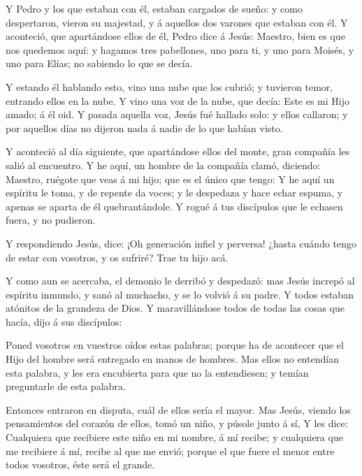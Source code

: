 Y Pedro y los que estaban con él, estaban cargados de
sueño: y como despertaron, vieron su majestad, y á aquellos dos varones
que estaban con él.  Y aconteció, que apartándose ellos de
él, Pedro dice á Jesús: Maestro, bien es que nos quedemos aquí: y
hagamos tres pabellones, uno para ti, y uno para Moisés, y uno para
Elías; no sabiendo lo que se decía.

 Y estando él hablando esto, vino una nube que los cubrió;
y tuvieron temor, entrando ellos en la nube.  Y vino una
voz de la nube, que decía: Este es mi Hijo amado; á él oid.
 Y pasada aquella voz, Jesús fué hallado solo: y ellos
callaron; y por aquellos días no dijeron nada á nadie de lo que habían
visto.

 Y aconteció al día siguiente, que apartándose ellos del
monte, gran compañía les salió al encuentro.  Y he aquí, un
hombre de la compañía clamó, diciendo: Maestro, ruégote que veas á mi
hijo; que es el único que tengo:  Y he aquí un espíritu le
toma, y de repente da voces; y le despedaza y hace echar espuma, y
apenas se aparta de él quebrantándole.  Y rogué á tus
discípulos que le echasen fuera, y no pudieron.

 Y respondiendo Jesús, dice: ¡Oh generación infiel y
perversa! ¿hasta cuándo tengo de estar con vosotros, y os sufriré? Trae
tu hijo acá.

 Y como aun se acercaba, el demonio le derribó y despedazó:
mas Jesús increpó al espíritu inmundo, y sanó al muchacho, y se lo
volvió á su padre.  Y todos estaban atónitos de la grandeza
de Dios. Y maravillándose todos de todas las cosas que hacía, dijo á sus
discípulos:

 Poned vosotros en vuestros oídos estas palabras; porque ha
de acontecer que el Hijo del hombre será entregado en manos de hombres.
 Mas ellos no entendían esta palabra, y les era encubierta
para que no la entendiesen; y temían preguntarle de esta palabra.

 Entonces entraron en disputa, cuál de ellos sería el
mayor.  Mas Jesús, viendo los pensamientos del corazón de
ellos, tomó un niño, y púsole junto á sí,  Y les dice:
Cualquiera que recibiere este niño en mi nombre, á mí recibe; y
cualquiera que me recibiere á mí, recibe al que me envió; porque el que
fuere el menor entre todos vosotros, éste será el grande.


